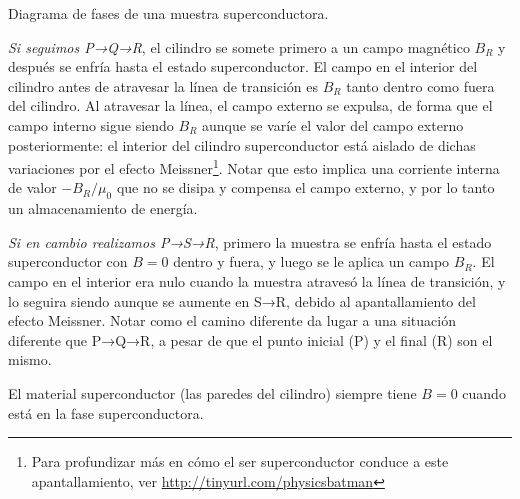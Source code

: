 \documentclass{tufte-book}
\newcommand{\sub}[1]{_{{\scriptscriptstyle\mathit{#1}}}}
\begin{document}
\begin{marginfigure}
  \centering
  \caption{Diagrama de fases de una muestra superconductora.}
  \label{fig:paths}
\end{marginfigure}

\textit{Si seguimos P→Q→R}, el cilindro se somete primero a un campo
magnético $B\sub{R}$ y después se enfría hasta el estado
superconductor. El campo en el interior del cilindro antes de
atravesar la línea de transición es $B\sub{R}$ tanto dentro como fuera
del cilindro. Al atravesar la línea, el campo externo se expulsa, de
forma que el campo interno sigue siendo $B\sub{R}$ aunque se varíe el
valor del campo externo posteriormente: el interior del cilindro
superconductor está aislado de dichas variaciones por el efecto
Meissner\footnote{Para profundizar más en cómo el ser superconductor
  conduce a este apantallamiento, ver
  \url{http://tinyurl.com/physicsbatman}}. Notar que esto implica una
corriente interna de valor $-B\sub{R}/μ_0$ que no se disipa y compensa
el campo externo, y por lo tanto un almacenamiento de energía.

\textit{Si en cambio realizamos P→S→R}, primero la muestra se enfría
hasta el estado superconductor con $B=0$ dentro y fuera, y luego se le
aplica un campo $B\sub{R}$. El campo en el interior era nulo cuando la
muestra atravesó la línea de transición, y lo seguira siendo aunque se
aumente en S→R, debido al apantallamiento del efecto Meissner. Notar
como el camino diferente da lugar a una situación diferente que P→Q→R,
a pesar de que el punto inicial (P) y el final (R) son el mismo.

El material superconductor (las paredes del cilindro) siempre tiene
$B=0$ cuando está en la fase superconductora.
\end{document}
